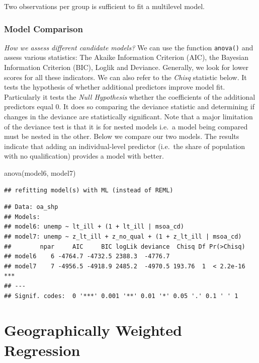 \documentclass[
]{book}
\newenvironment{Shaded}{\begin{snugshade}}{\end{snugshade}}
\newcommand{\FunctionTok}[1]{\textcolor[rgb]{0.00,0.00,0.00}{#1}}
\newcommand{\NormalTok}[1]{#1}
\begin{document}
Two observations per group is sufficient to fit a multilevel model.

\hypertarget{model-comparison}{%
\subsection{Model Comparison}\label{model-comparison}}

\emph{How we assess different candidate models?} We can use the function \texttt{anova()} and assess various statistics: The Akaike Information Criterion (AIC), the Bayesian Information Criterion (BIC), Loglik and Deviance. Generally, we look for lower scores for all these indicators. We can also refer to the \emph{Chisq} statistic below. It tests the hypothesis of whether additional predictors improve model fit. Particularly it tests the \emph{Null Hypothesis} whether the coefficients of the additional predictors equal 0. It does so comparing the deviance statistic and determining if changes in the deviance are statistically significant. Note that a major limitation of the deviance test is that it is for nested models i.e.~a model being compared must be nested in the other. Below we compare our two models. The results indicate that adding an individual-level predictor (i.e.~the share of population with no qualification) provides a model with better.

\begin{Shaded}
\begin{Highlighting}[]
\FunctionTok{anova}\NormalTok{(model6, model7)}
\end{Highlighting}
\end{Shaded}

\begin{verbatim}
## refitting model(s) with ML (instead of REML)
\end{verbatim}

\begin{verbatim}
## Data: oa_shp
## Models:
## model6: unemp ~ lt_ill + (1 + lt_ill | msoa_cd)
## model7: unemp ~ z_lt_ill + z_no_qual + (1 + z_lt_ill | msoa_cd)
##        npar     AIC     BIC logLik deviance  Chisq Df Pr(>Chisq)    
## model6    6 -4764.7 -4732.5 2388.3  -4776.7                         
## model7    7 -4956.5 -4918.9 2485.2  -4970.5 193.76  1  < 2.2e-16 ***
## ---
## Signif. codes:  0 '***' 0.001 '**' 0.01 '*' 0.05 '.' 0.1 ' ' 1
\end{verbatim}

\hypertarget{gwr}{%
\chapter{Geographically Weighted Regression}\label{gwr}}
\end{document}
